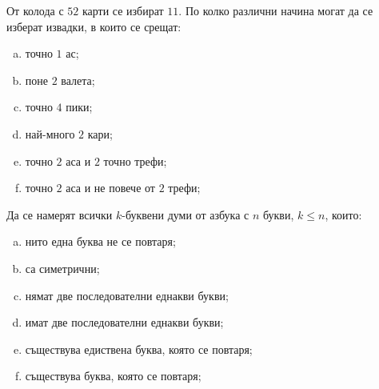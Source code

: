 \begin{problem}
  От колода с $52$ карти се избират $11$. По колко различни начина могат да се изберат извадки, в които се срещат:
  \begin{enumerate}[a)]
  \item
    точно $1$ ас;
  \item
    поне $2$ валета;
  \item
    точно $4$ пики;
  \item
    най-много $2$ кари;
  \item
    точно $2$ аса и $2$ точно трефи;
  \item
    точно $2$ аса и не повече от $2$ трефи;
\end{enumerate}
\end{problem}


\begin{problem}
  Да се намерят всички $k$-буквени думи от азбука с $n$ букви, $k\leq n$, които:
  \begin{enumerate}[a)]
  \item
    нито една буква не се повтаря;
  \item
    са симетрични;
  \item
    нямат две последователни еднакви букви;
  \item
    имат две последователни еднакви букви;
  \item
    съществува едиствена буква, която се повтаря;
  \item
    съществува буква, която се повтаря;
  \end{enumerate}
\end{problem}

